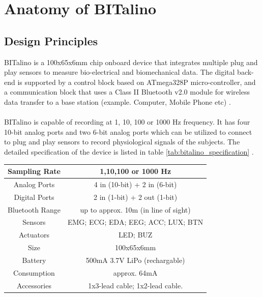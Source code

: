 \section{Anatomy of BITalino}
\subsection{Design Principles}
\label{design_principles}
BITalino is a 100x65x6mm chip onboard device that integrates multiple plug and play sensors to measure bio-electrical and biomechanical data. The digital back-end is supported by a control block based on ATmega328P micro-controller, and a communication block that uses a Class II Bluetooth v2.0 module for wireless data transfer to a base station (example. Computer, Mobile Phone etc) \cite{silva_bitalino:_2014}.

\paragraph{} BITalino is capable of recording at 1, 10, 100 or 1000 Hz frequency. It has four 10-bit analog ports and two 6-bit analog ports which can be utilized to connect to plug and play sensors to record physiological signals of the subjects. The detailed specification of the device is listed in table \ref{tab:bitalino_specification} \cite{bitalino_datasheet}.

\begin{center}
\begin{tabular}{ |c|c| }
\hline
Sampling Rate & 1,10,100 or 1000 Hz \\
\hline
Analog Ports & 4 in (10-bit) + 2 in (6-bit) \\
\hline
Digital Ports & 2 in (1-bit) + 2 out (1-bit) \\
\hline
Bluetooth Range & up to approx. 10m (in line of sight) \\
\hline
Sensors & EMG; ECG; EDA; EEG; ACC; LUX; BTN \\
\hline
Actuators & LED; BUZ \\
\hline
Size & 100x65x6mm \\
\hline
Battery & 500mA 3.7V LiPo (rechargable) \\
\hline
Consumption & approx. 64mA \\
\hline
Accessories & 1x3-lead cable; 1x2-lead cable. \\
\hline
\end{tabular}
\label{tab:bitalino_specification}
\end{center}

